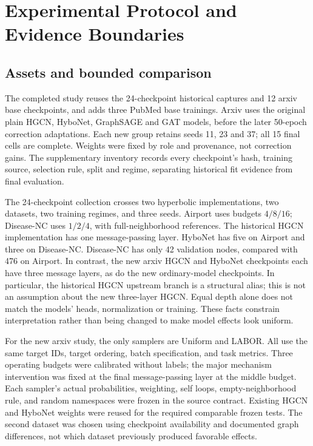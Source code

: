 \section{Experimental Protocol and Evidence Boundaries}
\label{sec:protocol}
\subsection{Assets and bounded comparison}
The completed study reuses the 24-checkpoint historical captures and 12 arxiv base checkpoints, and adds three PubMed base trainings. Arxiv uses the original plain HGCN, HyboNet, GraphSAGE and GAT models, before the later 50-epoch correction adaptations. Each new group retains seeds 11, 23 and 37; all 15 final cells are complete. Weights were fixed by role and provenance, not correction gains. The supplementary inventory records every checkpoint's hash, training source, selection rule, split and regime, separating historical fit evidence from final evaluation.

The 24-checkpoint collection crosses two hyperbolic implementations, two datasets, two training regimes, and three seeds. Airport uses budgets $4/8/16$; Disease-NC uses $1/2/4$, with full-neighborhood references. The historical HGCN implementation has one message-passing layer. HyboNet has five on Airport and three on Disease-NC. Disease-NC has only 42 validation nodes, compared with 476 on Airport. In contrast, the new arxiv HGCN and HyboNet checkpoints each have three message layers, as do the new ordinary-model checkpoints. In particular, the historical HGCN upstream branch is a structural alias; this is not an assumption about the new three-layer HGCN. Equal depth alone does not match the models' heads, normalization or training. These facts constrain interpretation rather than being changed to make model effects look uniform.

For the new arxiv study, the only samplers are Uniform and LABOR. All use the same target IDs, target ordering, batch specification, and task metrics. Three operating budgets were calibrated without labels; the major mechanism intervention was fixed at the final message-passing layer at the middle budget. Each sampler's actual probabilities, weighting, self loops, empty-neighborhood rule, and random namespaces were frozen in the source contract. Existing HGCN and HyboNet weights were reused for the required comparable frozen tests. The second dataset was chosen using checkpoint availability and documented graph differences, not which dataset previously produced favorable effects.

